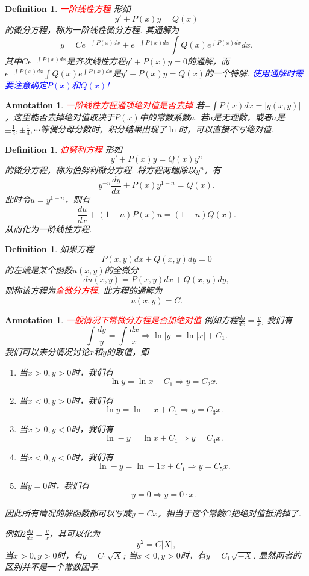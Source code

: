 \documentclass{article}
\newtheorem{definition}[theorem]{Definition}
\newtheorem{annotation}[theorem]{Annotation}
\newcommand{\redt}[1]{\textcolor{red}{#1}}
\newcommand{\bluet}[1]{\textcolor{blue}{#1}}
\begin{document}
\begin{definition}
\rm \redt{一阶线性方程} 形如
$$
y'+P(x)y = Q(x)
$$
的微分方程，称为一阶线性微分方程. 其通解为
$$
y= Ce^{-\int P(x)dx } + e^{-\int P(x)dx }\int Q(x)e^{\int P(x)dx}dx. 
$$
其中$Ce^{-\int P(x)dx }$是齐次线性方程$y'+P(x)y=0$的通解，而$e^{-\int P(x)dx }\int Q(x)e^{\int P(x)dx}$是$y'+P(x)y=Q(x)$的一个特解. \bluet{使用通解时需要注意确定$P(x)$和$Q(x)$!}
\end{definition}


\begin{annotation}
\rm \redt{一阶线性方程通项绝对值是否去掉} 若$-\int P(x)dx = |g(x,y)|$，这里能否去掉绝对值取决于$P(x)$中的常数系数$a$. 若$a$是无理数，或者$a$是$\pm \frac{1}{2},\pm \frac{1}{4},\cdots$等偶分母分数时，积分结果出现了$\ln$时，可以直接不写绝对值.  
\end{annotation}

\begin{definition}
\rm \redt{伯努利方程} 形如
$$
y' +P(x)y=Q(x)y^n
$$
的微分方程，称为伯努利微分方程. 将方程两端除以$y^n$，有
$$
y^{-n} \frac{dy}{dx} + P(x)y^{1-n} = Q(x).
$$
此时令$u = y^{1-n}$，则有
$$
\frac{du}{dx} + (1-n)P(x)u = (1-n)Q(x).
$$
从而化为一阶线性方程. 
\end{definition}

\begin{definition}
\rm 如果方程
$$
P(x,y)dx + Q(x,y)dy = 0
$$
的左端是某个函数$u(x,y)$的全微分
$$
du(x,y) = P(x,y)dx + Q(x,y)dy,
$$
则称该方程为\redt{全微分方程}. 此方程的通解为
$$
u(x,y) = C. 
$$
\end{definition}

\begin{annotation}
\rm \redt{一般情况下常微分方程是否加绝对值} 例如方程$\frac{dy}{dx} = \frac{y}{x}$, 我们有
$$
\int \frac{dy}{y} = \int \frac{dx}{x} \Rightarrow \ln |y| = \ln |x| + C_1. 
$$
我们可以来分情况讨论$x$和$y$的取值，即
\begin{enumerate}
	\item 当$x > 0, y > 0$时，我们有
	$$
	\ln y = \ln x + C_1 \Rightarrow y = C_2 x.
	$$
	\item 当$x < 0, y > 0$时，我们有
	$$
	\ln y = \ln -x + C_1 \Rightarrow y = C_3 x.
	$$
	\item 当$x > 0 , y < 0$时，我们有
	$$
	\ln -y = \ln x + C_1 \Rightarrow y= C_4 x.
	$$
	\item 当$x < 0, y < 0$时，我们有
	$$
	\ln -y = \ln -1x + C_1 \Rightarrow y = C_5 x.
	$$
	\item 当$y = 0$时，我们有
	$$
	y = 0 \Rightarrow y = 0 \cdot x.
	$$
\end{enumerate}
因此所有情况的解函数都可以写成$y = Cx$，相当于这个常数$C$把绝对值抵消掉了. 

例如$2\frac{dy}{dx} = \frac{y}{x}$，其可以化为
$$
y^2 = C|X|,
$$
当$x > 0, y > 0$时，有$y = C_1\sqrt{X}$; 当$x < 0, y >0$时，有$y=C_1\sqrt{-X}$. 显然两者的区别并不是一个常数因子. 
\end{annotation}
\end{document}
